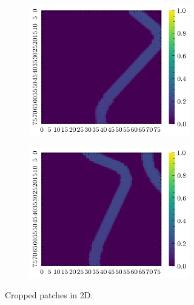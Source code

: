 \documentclass[../document.tex]{subfiles}
\begin{document}
\begin{figure}[H]
\begin{subfigure}[b]{1\textwidth}
\begin{subfigure}[b]{0.19\textwidth}
    \includegraphics[width=\linewidth]{../img/bars1-example-patches/2d/7.png}    
    \end{subfigure}  
    \begin{subfigure}[b]{0.19\textwidth}
    \includegraphics[width=\linewidth]{../img/bars1-example-patches/2d/14.png}    
    \end{subfigure}  
\caption{Cropped patches in 2D.}
\end{subfigure}  
\begin{subfigure}[b]{1\textwidth}
    \begin{subfigure}[b]{0.19\textwidth}

\end{subfigure}
\end{subfigure}
\end{figure}
\end{document}
